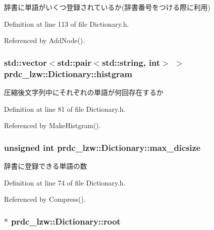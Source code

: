 辞書に単語がいくつ登録されているか(辞書番号をつける際に利用) 



Definition at line 113 of file Dictionary.\-h.



Referenced by Add\-Node().

\hypertarget{classprdc__lzw_1_1Dictionary_a66677a981aa5a55b91978a5f642b9c06}{
\subsubsection[{histgram}]{\setlength{\rightskip}{0pt plus 5cm}std\-::vector$<$std\-::pair$<$std\-::string, int$>$ $>$ prdc\-\_\-lzw\-::\-Dictionary\-::histgram}}\label{classprdc__lzw_1_1Dictionary_a66677a981aa5a55b91978a5f642b9c06}


圧縮後文字列中にそれぞれの単語が何回存在するか 



Definition at line 81 of file Dictionary.\-h.



Referenced by Make\-Histgram().

\hypertarget{classprdc__lzw_1_1Dictionary_a27f3bda2d7baeb3c7a62db57de66ffb7}{
\subsubsection[{max\-\_\-dicsize}]{\setlength{\rightskip}{0pt plus 5cm}unsigned int prdc\-\_\-lzw\-::\-Dictionary\-::max\-\_\-dicsize}}\label{classprdc__lzw_1_1Dictionary_a27f3bda2d7baeb3c7a62db57de66ffb7}


辞書に登録できる単語の数 



Definition at line 74 of file Dictionary.\-h.



Referenced by Compress().

\hypertarget{classprdc__lzw_1_1Dictionary_a95b84d2d9ebb6277cfc6bffba5dee738}{
\subsubsection[{root}]{$\ast$ prdc\-\_\-lzw\-::\-Dictionary\-::root\hspace{0.3cm}{\ttfamily [private]}}}\label{classprdc__lzw_1_1Dictionary_a95b84d2d9ebb6277cfc6bffba5dee738}


